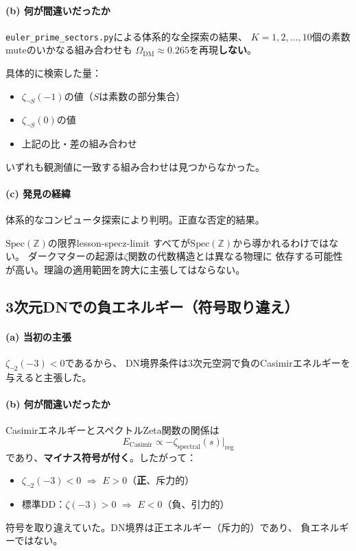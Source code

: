 \documentclass[11pt,a4paper]{article}
\newcommand{\Spec}{\mathrm{Spec}}
\begin{document}
\paragraph{(b) 何が間違いだったか}
\texttt{euler\_prime\_sectors.py}による体系的な全探索の結果、
$K = 1, 2, \ldots, 10$個の素数muteのいかなる組み合わせも
$\Omega_{\mathrm{DM}} \approx 0.265$を再現\textbf{しない}。

具体的に検索した量：
\begin{itemize}
\item $\zeta_{\neg S}(-1)$の値（$S$は素数の部分集合）
\item $\zeta_{\neg S}(0)$の値
\item 上記の比・差の組み合わせ
\end{itemize}
いずれも観測値に一致する組み合わせは見つからなかった。

\paragraph{(c) 発見の経緯}
体系的なコンピュータ探索により判明。正直な否定的結果。

\begin{keylesson}{$\Spec(\mathbb{Z})$の限界}{lesson-specz-limit}
すべてが$\Spec(\mathbb{Z})$から導かれるわけではない。
ダークマターの起源は$\zeta$関数の代数構造とは異なる物理に
依存する可能性が高い。理論の適用範囲を誇大に主張してはならない。
\end{keylesson}


\subsection{3次元DNでの負エネルギー（符号取り違え）}
\label{sec:15.7}

\paragraph{(a) 当初の主張}
$\zeta_{\neg 2}(-3) < 0$であるから、
DN境界条件は3次元空洞で負のCasimirエネルギーを与えると主張した。

\paragraph{(b) 何が間違いだったか}
CasimirエネルギーとスペクトルZeta関数の関係は
\[
E_{\text{Casimir}} \propto -\zeta_{\text{spectral}}(s)\big|_{\text{reg}}
\]
であり、\textbf{マイナス符号が付く}。したがって：
\begin{itemize}
\item $\zeta_{\neg 2}(-3) < 0$ $\Longrightarrow$ $E > 0$（\textbf{正}、斥力的）
\item 標準DD：$\zeta(-3) > 0$ $\Longrightarrow$ $E < 0$（負、引力的）
\end{itemize}
符号を取り違えていた。DN境界は正エネルギー（斥力的）であり、
負エネルギーではない。
\end{document}
